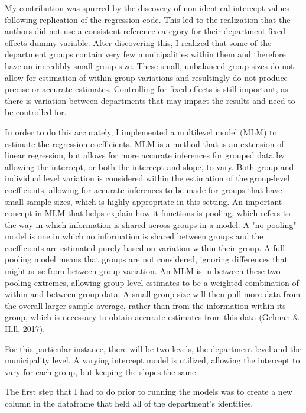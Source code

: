 \documentclass[12pt,letterpaper]{article}
\begin{document}
	My contribution was spurred by the discovery of non-identical intercept values following replication of the regression code. This led to the realization that the authors did not use a consistent reference category for their department fixed effects dummy variable. After discovering this, I realized that some of the department groups contain very few municipalities within them and therefore have an incredibly small group size. These small, unbalanced group sizes do not allow for estimation of within-group variations and resultingly do not produce precise or accurate estimates. Controlling for fixed effects is still important, as there is variation between departments that may impact the results and need to be controlled for.
	
	In order to do this accurately, I implemented a multilevel model (MLM) to estimate the regression coefficients. MLM is a method that is an extension of linear regression, but allows for more accurate inferences for grouped data by allowing the intercept, or both the intercept and slope, to vary. Both group and individual level variation is considered within the estimation of the group-level coefficients, allowing for accurate inferences to be made for groups that have small sample sizes, which is highly appropriate in this setting. An important concept in MLM that helps explain how it functions is pooling, which refers to the way in which information is shared across groups in a model. A "no pooling" model is one in which no information is shared between groups and the coefficients are estimated purely based on variation within their group. A full pooling model means that groups are not considered, ignoring differences that might arise from between group variation. An MLM is in between these two pooling extremes, allowing group-level estimates to be a weighted combination of within and between group data. A small group size will then pull more data from the overall larger sample average, rather than from the information within its group, which is necessary to obtain accurate estimates from this data (Gelman \& Hill, 2017). 
		
	For this particular instance, there will be two levels, the department level and the municipality level. A varying intercept model is utilized, allowing the intercept to vary for each group, but keeping the slopes the same. 
	
	The first step that I had to do prior to running the models was to create a new column in the dataframe that held all of the department's identities. 
	
\end{document}
